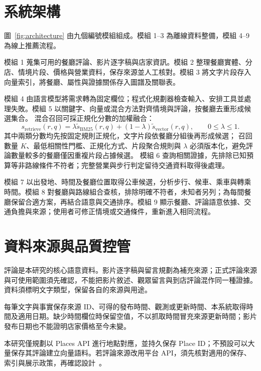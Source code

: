 \section{系統架構}
\label{sec:architecture}

圖~\ref{fig:architecture} 由九個編號模組組成。模組 1--3 為離線資料整備，模組 4--9 為線上推薦流程。




模組 1 蒐集可用的餐廳評論、影片逐字稿與店家資訊。模組 2 整理餐廳實體、分店、情境片段、價格與營業資料，保存來源並人工核對。模組 3 將文字片段存入向量索引，將餐廳、屬性與證據關係存入圖譜及關聯表。

模組 4 由語言模型將需求轉為固定欄位；程式化規劃器檢查輸入、安排工具並處理失敗。模組 5 以關鍵字、向量或混合方法對齊情境與評論，按餐廳去重形成候選集合。
混合召回可採正規化分數的加權融合：
\[
s_{\mathrm{retrieve}}(r,q)=\lambda\widetilde{s}_{\mathrm{BM25}}(r,q)
+(1-\lambda)\widetilde{s}_{\mathrm{vector}}(r,q),\qquad 0\leq\lambda\leq1.
\]
其中兩類分數均先按固定規則正規化，文字片段依餐廳分組後再形成候選；
召回數量 \(K\)、最低相關性門檻、正規化方式、片段聚合規則與 \(\lambda\) 必須版本化，避免評論數量較多的餐廳僅因重複片段占據候選。
模組 6 查詢相關證據，先排除已知預算等非路線條件不符者；完整營業與步行判定留待交通資料取得後處理。

模組 7 以出發地、時間及餐廳位置取得公車候選，分析步行、候車、乘車與轉乘時間。模組 8 對餐廳與路線組合查核，排除明確不符者，未知者另列；為每間餐廳保留合適方案，再結合語意與交通排序。模組 9 顯示餐廳、評論語意依據、交通負擔與來源；使用者可修正情境或交通條件，重新進入相同流程。

\section{資料來源與品質控管}
\label{sec:data}




評論是本研究的核心語意資料。影片逐字稿與留言規劃為補充來源；正式評論來源與可使用範圍須先確認，不能把影片敘述、觀眾留言與到店評論混作同一種證據。資料須標明文字類型，保留各自的來源與用途。

每筆文字與事實保存來源 ID、可得的發布時間、觀測或更新時間、本系統取得時間及適用日期。缺少時間欄位時保留空值，不以抓取時間冒充來源更新時間；影片發布日期也不能證明店家價格至今未變。

本研究僅規劃以 Places API 進行地點對應，並持久保存 Place ID；不預設可以大量保存其評論建立向量語料。若評論來源改用平台 API，須先核對適用的保存、索引與展示政策，再確認設計~\cite{google_places_policy}。

